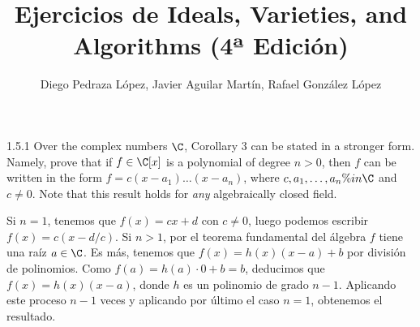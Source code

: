 \documentclass[twoside]{article}
\begin{document}
\title{Ejercicios de Ideals, Varieties, and Algorithms (4ª Edición)}
\author{Diego Pedraza López, Javier Aguilar Martín, Rafael González López}
\maketitle

\begin{ejercicio}{1.5.1}
Over the complex numbers $\C$, Corollary 3 can be stated in a stronger form. Namely, prove that if $f \in \C[x]$ is a polynomial of degree $n > 0$, then $f$ can be written in the form $f = c(x-a_1)\dots(x-a_n)$, where $c,a_1,\dots,a_n \%in \C$ and $c \neq 0$.
Note that this result  holds for \emph{any} algebraically closed field.
\end{ejercicio}
\begin{solucion}
Si $n = 1$, tenemos que $f(x) = cx+d$ con $c \neq 0$, luego podemos escribir $f(x) = c(x-d/c)$.
Si $n > 1$, por el teorema fundamental del álgebra $f$ tiene una raíz $a \in \C$.
Es más, tenemos que $f(x) = h(x)(x-a)+b$ por división de polinomios.
Como $f(a) = h(a)\cdot 0 + b = b$, deducimos que $f(x) = h(x)(x-a)$, donde $h$ es un polinomio de grado $n-1$.
Aplicando este proceso $n-1$ veces y aplicando por último el caso $n=1$, obtenemos el resultado.
\end{solucion}

\newpage
\end{document}
